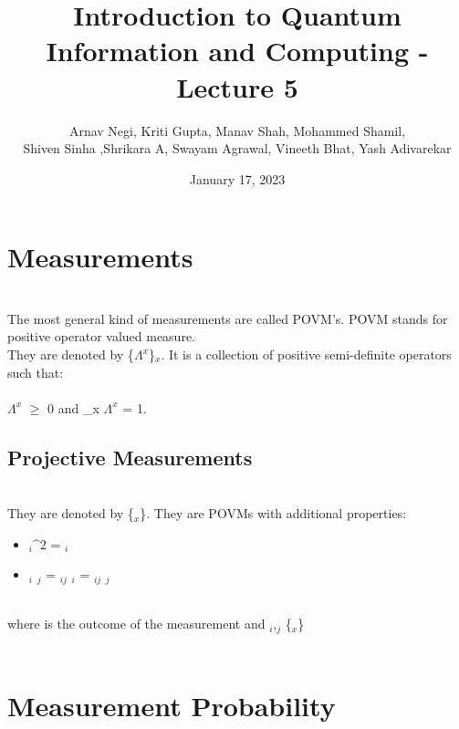 \documentclass{article}
\title{Introduction to Quantum Information and Computing - Lecture 5}
\author{Arnav Negi, Kriti Gupta, Manav Shah, Mohammed Shamil,\\ Shiven Sinha ,Shrikara A, Swayam Agrawal, Vineeth Bhat, Yash Adivarekar}
\date{January 17, 2023}
\begin{document}
\maketitle
\section{Measurements} \\
The most general kind of measurements are called POVM’s. POVM stands for positive operator valued measure. \\
They are denoted by \{$\Lambda^{x}$\}$_{x}$. It is a collection of positive semi-definite operators such that: \\ \\
{$\Lambda^{x}$} $\ge$ 0 and \sum\limits_{x} {$\Lambda^{x}$} = 1. \\

\subsection{Projective Measurements} \\
They are denoted by \{$_{x}$\}. They are POVMs with additional properties:
\begin{itemize}
    \item {}$_{i}$^{2} = $_{i}$
\end{itemize}
\begin{itemize}
    \item {}$_{i}$ $_{j}$  = \delta$_{ij}$ $_{i}$ = \delta$_{ij}$ $_{j}$
\end{itemize}
\\

where  is the outcome of the measurement and $_{i}$,$_{j}$ \in \{$_{x}$\} \\ \\

\section{Measurement Probability}
\end{document}
